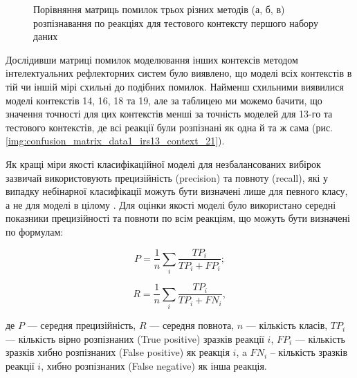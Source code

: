 \begin{figure}[!t]
	\centering
	
	\caption{Порівняння матриць помилок трьох різних методів (а, б, в) розпізнавання по реакціях для тестового контексту першого набору даних}
	\label{img:confusion_matrix_data1_context_21}
\end{figure}

Дослідивши матриці помилок моделювання інших контексів методом інтелектуальних рефлекторних систем було виявлено, що моделі всіх контекстів в тій чи іншій мірі схильні до подібних помилок. Найменш схильними виявилися моделі контекстів 14, 16, 18 та 19, але за таблицею ми можемо бачити, що значення точності для цих контекстів менші за точність моделей для 13-го та тестового контекстів, де всі реакції були розпізнані як одна й та ж сама (рис. \ref{img:confusion_matrix_data1_irs13_context_21}).

Як кращі міри якості класифікаційної моделі для незбалансованих вибірок зазвичай використовують прецизійність (precision) та повноту (recall), які у випадку небінарної класифікації можуть бути визначені лише для певного класу, а не для моделі в цілому \cite{Powers_2011}. Для оцінки якості моделі було використано середні показники прецизійності та повноти по всім реакціям, що можуть бути визначені по формулам:

\begin{equation}
\label{eq:рrecision}
P=\frac{1}{n}\sum\limits_i\frac{TP_i}{TP_i+FP_i};
\end{equation}

\begin{equation}
\label{eq:recall}
R=\frac{1}{n}\sum\limits_i\frac{TP_i}{TP_i+FN_i},
\end{equation}

де $P$ --- середня прецизійність, $R$ --- середня повнота, $n$ --- кількість класів, $TP_i$ --- кількість вірно розпізнаних (True positive) зразків реакції $i$, $FP_i$ --- кількість зразків хибно розпізнаних (False positive) як реакція $i$, a $FN_i$ -- кількість зразків реакції $i$, хибно розпізнаних (False negative) як інша реакція.

